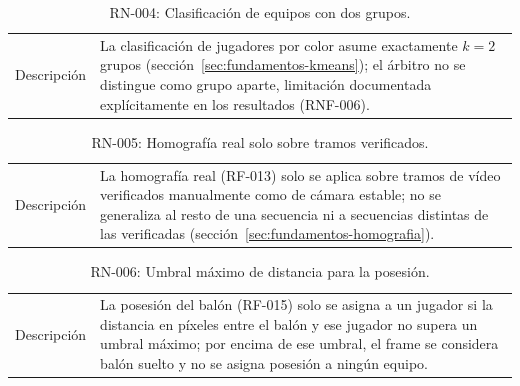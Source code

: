 \begin{table}[htp]
\centering
\caption{RN-004: Clasificación de equipos con dos grupos.}
\label{tab:rn-004}
\renewcommand{\arraystretch}{1.2}
\begin{tabular}{|p{3.1cm}|p{9.2cm}|}
\hline
\rowcolor{gray!25}
\multicolumn{2}{|l|}{\textbf{RN-004 -- Clasificación de equipos con dos grupos}} \\
\hline
Descripción & La clasificación de jugadores por color asume exactamente
  $k=2$ grupos (sección~\ref{sec:fundamentos-kmeans}); el árbitro no se
  distingue como grupo aparte, limitación documentada explícitamente en
  los resultados (RNF-006). \\
\hline
\end{tabular}
\end{table}

\begin{table}[htp]
\centering
\caption{RN-005: Homografía real solo sobre tramos verificados.}
\label{tab:rn-005}
\renewcommand{\arraystretch}{1.2}
\begin{tabular}{|p{3.1cm}|p{9.2cm}|}
\hline
\rowcolor{gray!25}
\multicolumn{2}{|l|}{\textbf{RN-005 -- Homografía real solo sobre tramos verificados}} \\
\hline
Descripción & La homografía real (RF-013) solo se aplica sobre tramos de
  vídeo verificados manualmente como de cámara estable; no se generaliza al
  resto de una secuencia ni a secuencias distintas de las verificadas
  (sección~\ref{sec:fundamentos-homografia}). \\
\hline
\end{tabular}
\end{table}

\begin{table}[htp]
\centering
\caption{RN-006: Umbral máximo de distancia para la posesión.}
\label{tab:rn-006}
\renewcommand{\arraystretch}{1.2}
\begin{tabular}{|p{3.1cm}|p{9.2cm}|}
\hline
\rowcolor{gray!25}
\multicolumn{2}{|l|}{\textbf{RN-006 -- Umbral máximo de distancia para la posesión}} \\
\hline
Descripción & La posesión del balón (RF-015) solo se asigna a un jugador si
  la distancia en píxeles entre el balón y ese jugador no supera un umbral
  máximo; por encima de ese umbral, el frame se considera balón suelto y no
  se asigna posesión a ningún equipo. \\
\hline
\end{tabular}
\end{table}

